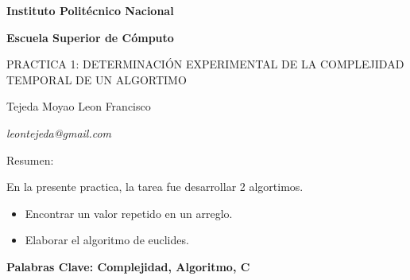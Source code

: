 \documentclass{report}
\begin{document}
	\begin{titlepage}
		\begin{center}
			\bfseries\LARGE Instituto Politécnico Nacional \par
			\bfseries\LARGE Escuela Superior de Cómputo \par
			\vspace{3cm}
			\scshape\large PRACTICA 1: DETERMINACIÓN EXPERIMENTAL DE LA COMPLEJIDAD TEMPORAL DE UN ALGORTIMO \par
			\vspace{1cm}
			\large Tejeda Moyao Leon Francisco \par
			\itshape\large leontejeda@gmail.com \par
			\vspace{1cm}
		\end{center}
		
		
		\begin{bf}
			\large Resumen:
		\end{bf}
	
		\large En la presente practica, la tarea fue desarrollar 2 algortimos.\par
		\begin{itemize}
			\item Encontrar un valor repetido en un arreglo.
			\item Elaborar el algoritmo de euclides.
		\end{itemize}
			
		\bf\large Palabras Clave: Complejidad, Algoritmo, C \par
		
		\vfill
	\end{titlepage}
\end{document}
